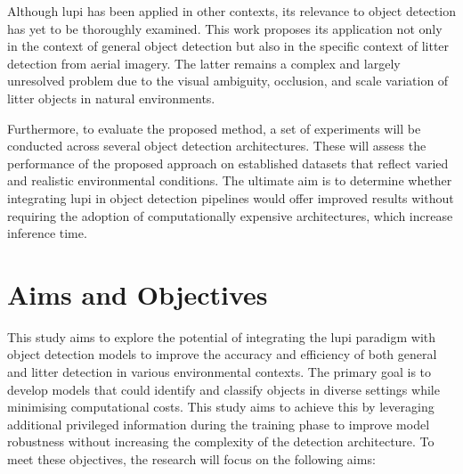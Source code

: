 Although \gls{lupi} has been applied in other contexts, its relevance to object detection has yet to be thoroughly examined. This work proposes its application not only in the context of general object detection but also in the specific context of litter detection from aerial imagery. The latter remains a complex and largely unresolved problem due to the visual ambiguity, occlusion, and scale variation of litter objects in natural environments.

Furthermore, to evaluate the proposed method, a set of experiments will be conducted across several object detection architectures. These will assess the performance of the proposed approach on established datasets that reflect varied and realistic environmental conditions. The ultimate aim is to determine whether integrating \gls{lupi} in object detection pipelines would offer improved results without requiring the adoption of computationally expensive architectures, which increase inference time.

\section{Aims and Objectives}
\label{sec:aims}

This study aims to explore the potential of integrating the \gls{lupi} paradigm with object detection models to improve the accuracy and efficiency of both general and litter detection in various environmental contexts. The primary goal is to develop models that could identify and classify objects in diverse settings while minimising computational costs. This study aims to achieve this by leveraging additional privileged information during the training phase to improve model robustness without increasing the complexity of the detection architecture. To meet these objectives, the research will focus on the following aims:

